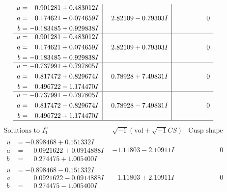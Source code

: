 \documentclass[1p]{elsarticle_modified}
\theoremstyle{definition}
\newcommand{\I}{\sqrt{-1}}
\begin{document}
$$\begin{array}{c|c|c}
\begin{aligned}
u &= \phantom{-}0.901281 + 0.483012 I \\
a &= \phantom{-}0.174621 - 0.074659 I \\
b &= -0.183485 + 0.929838 I\end{aligned}
 & \phantom{-}2.82109 - 0.79303 I & \phantom{-0.000000 } 0 \\ \hline\begin{aligned}
u &= \phantom{-}0.901281 - 0.483012 I \\
a &= \phantom{-}0.174621 + 0.074659 I \\
b &= -0.183485 - 0.929838 I\end{aligned}
 & \phantom{-}2.82109 + 0.79303 I & \phantom{-0.000000 } 0 \\ \hline\begin{aligned}
u &= -0.737991 + 0.797805 I \\
a &= \phantom{-}0.817472 + 0.829674 I \\
b &= \phantom{-}0.496722 - 1.174470 I\end{aligned}
 & \phantom{-}0.78928 + 7.49831 I & \phantom{-0.000000 } 0 \\ \hline\begin{aligned}
u &= -0.737991 - 0.797805 I \\
a &= \phantom{-}0.817472 - 0.829674 I \\
b &= \phantom{-}0.496722 + 1.174470 I\end{aligned}
 & \phantom{-}0.78928 - 7.49831 I & \phantom{-0.000000 } 0\\
 \hline 
 \end{array}$$\newpage$$\begin{array}{c|c|c}  
\text{Solutions to }I^u_{1}& \I (\text{vol} + \sqrt{-1}CS) & \text{Cusp shape}\\
 \hline 
\begin{aligned}
u &= -0.898468 + 0.151332 I \\
a &= \phantom{-}0.0921622 + 0.0914888 I \\
b &= \phantom{-}0.274475 + 1.005400 I\end{aligned}
 & -1.11803 - 2.10911 I & \phantom{-0.000000 } 0 \\ \hline\begin{aligned}
u &= -0.898468 - 0.151332 I \\
a &= \phantom{-}0.0921622 - 0.0914888 I \\
b &= \phantom{-}0.274475 - 1.005400 I\end{aligned}
 & -1.11803 + 2.10911 I & \phantom{-0.000000 } 0 \\ \hline\begin{aligned}

\end{aligned}
\end{array}$$
\end{document}
